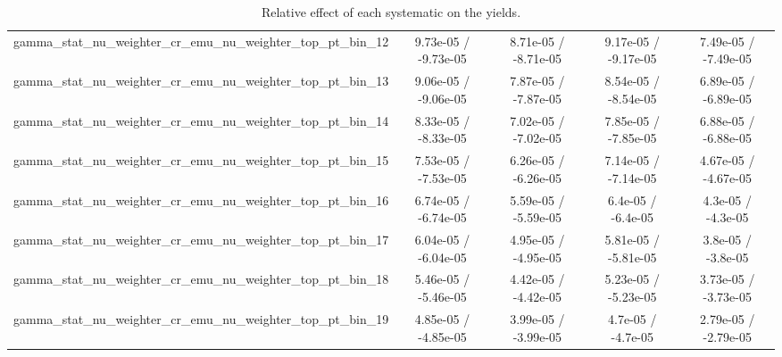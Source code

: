 \documentclass[10pt]{article}
\begin{document}
\begin{table}[htbp]
\begin{center}
\begin{tabular}{|c|c|c|c|c|}
  gamma_stat_nu_weighter_cr_emu_nu_weighter_top_pt_bin_12 & 9.73e-05 / -9.73e-05 & 8.71e-05 / -8.71e-05 & 9.17e-05 / -9.17e-05 & 7.49e-05 / -7.49e-05 \\ 
  gamma_stat_nu_weighter_cr_emu_nu_weighter_top_pt_bin_13 & 9.06e-05 / -9.06e-05 & 7.87e-05 / -7.87e-05 & 8.54e-05 / -8.54e-05 & 6.89e-05 / -6.89e-05 \\ 
  gamma_stat_nu_weighter_cr_emu_nu_weighter_top_pt_bin_14 & 8.33e-05 / -8.33e-05 & 7.02e-05 / -7.02e-05 & 7.85e-05 / -7.85e-05 & 6.88e-05 / -6.88e-05 \\ 
  gamma_stat_nu_weighter_cr_emu_nu_weighter_top_pt_bin_15 & 7.53e-05 / -7.53e-05 & 6.26e-05 / -6.26e-05 & 7.14e-05 / -7.14e-05 & 4.67e-05 / -4.67e-05 \\ 
  gamma_stat_nu_weighter_cr_emu_nu_weighter_top_pt_bin_16 & 6.74e-05 / -6.74e-05 & 5.59e-05 / -5.59e-05 & 6.4e-05 / -6.4e-05 & 4.3e-05 / -4.3e-05 \\ 
  gamma_stat_nu_weighter_cr_emu_nu_weighter_top_pt_bin_17 & 6.04e-05 / -6.04e-05 & 4.95e-05 / -4.95e-05 & 5.81e-05 / -5.81e-05 & 3.8e-05 / -3.8e-05 \\ 
  gamma_stat_nu_weighter_cr_emu_nu_weighter_top_pt_bin_18 & 5.46e-05 / -5.46e-05 & 4.42e-05 / -4.42e-05 & 5.23e-05 / -5.23e-05 & 3.73e-05 / -3.73e-05 \\ 
  gamma_stat_nu_weighter_cr_emu_nu_weighter_top_pt_bin_19 & 4.85e-05 / -4.85e-05 & 3.99e-05 / -3.99e-05 & 4.7e-05 / -4.7e-05 & 2.79e-05 / -2.79e-05 \\ 
\hline 
\end{tabular} 
\caption{Relative effect of each systematic on the yields.} 
\end{center} 
\end{table} 
\end{document}

